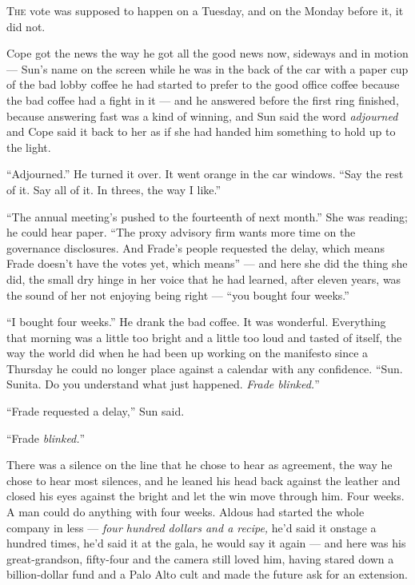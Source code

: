 \documentclass[11pt,openany]{book}
\begin{document}
\lettrine[lines=3, lhang=0.05, nindent=0.25em]{T}{he} vote was supposed to happen on a Tuesday, and on the Monday before it, it did not.

Cope got the news the way he got all the good news now, sideways and in motion --- Sun's name on the screen while he was in the back of the car with a paper cup of the bad lobby coffee he had started to prefer to the good office coffee because the bad coffee had a fight in it --- and he answered before the first ring finished, because answering fast was a kind of winning, and Sun said the word \textit{adjourned} and Cope said it back to her as if she had handed him something to hold up to the light.

``Adjourned.'' He turned it over. It went orange in the car windows. ``Say the rest of it. Say all of it. In threes, the way I like.''

``The annual meeting's pushed to the fourteenth of next month.'' She was reading; he could hear paper. ``The proxy advisory firm wants more time on the governance disclosures. And Frade's people requested the delay, which means Frade doesn't have the votes yet, which means'' --- and here she did the thing she did, the small dry hinge in her voice that he had learned, after eleven years, was the sound of her not enjoying being right --- ``you bought four weeks.''

``I bought four weeks.'' He drank the bad coffee. It was wonderful. Everything that morning was a little too bright and a little too loud and tasted of itself, the way the world did when he had been up working on the manifesto since a Thursday he could no longer place against a calendar with any confidence. ``Sun. Sunita. Do you understand what just happened. \textit{Frade blinked.}''

``Frade requested a delay,'' Sun said.

``Frade \textit{blinked.}''

There was a silence on the line that he chose to hear as agreement, the way he chose to hear most silences, and he leaned his head back against the leather and closed his eyes against the bright and let the win move through him. Four weeks. A man could do anything with four weeks. Aldous had started the whole company in less --- \textit{four hundred dollars and a recipe,} he'd said it onstage a hundred times, he'd said it at the gala, he would say it again --- and here was his great-grandson, fifty-four and the camera still loved him, having stared down a billion-dollar fund and a Palo Alto cult and made the future ask for an extension.
\end{document}
